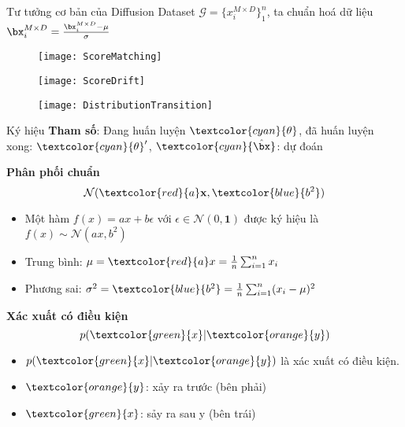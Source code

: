 \begin{frame}{Tư tưởng cơ bản của Diffusion}
	Dataset $\mathcal{G} = \{ x_{i}^{M \times D} \}_{1}^{n}$, ta chuẩn hoá dữ liệu $\bx_{i}^{M \times D} = \frac{\bx_{i}^{M \times D} - \mu}{\sigma}$
\begin{figure}
	\texttt{[image: ScoreMatching]}
\end{figure}
\vspace{-10pt}
\begin{figure}
	\texttt{[image: ScoreDrift]}
\end{figure}

\vspace{-10pt}

\begin{figure}
	\texttt{[image: DistributionTransition]}
\end{figure}

\end{frame}

\begin{frame}{Ký hiệu}
	\textbf{Tham số}: Đang huấn luyện {\Large$\textcolor{cyan}{\theta}$}, đã huấn luyện xong: {\Large$\textcolor{cyan}{\theta}'$}, {\Large$\textcolor{cyan}{\hat{\bx}}$}: dự đoán
	\vspace{-5pt}
	
	\textbf{Phân phối chuẩn}
	\vspace{-5pt}
	{\Large $$\mathcal{N}(\textcolor{red}{a} \mathbf{x}, \textcolor{blue}{b^2})$$}
	\vspace{-15pt}
	\begin{itemize}
		\item Một hàm $f(x) = a x + b\epsilon$ với $\epsilon \in \mathcal{N}(0, \mathbf{1})$ được ký hiệu là $f(x) \sim \mathcal{N}(a x, b^2) $
		
		\item Trung bình: $\mu = \textcolor{red}{a}x=\frac{1}{n} \sum_{i=1}^{n} x_i$
		
		\item Phương sai: $\sigma^2 = \textcolor{blue} {b^2} = \frac{1}{n} \sum_{i=1}^{n} (x_i - \mu)^2$
		
	\end{itemize}
	\textbf{Xác xuất có điều kiện}
	\vspace{-5pt}
	{\Large $$p(\textcolor{green}{x}| \textcolor{orange}{y})$$}
	\vspace{-15pt}
	
	\begin{itemize}
		\item $p(\textcolor{green}{x}| \textcolor{orange}{y})$ là xác xuất có điều kiện.
		\item $\textcolor{orange}{y}$: xảy ra trước (bên phải)
		\item $\textcolor{green}{x}$: sảy ra sau y (bên trái)
	\end{itemize}

\end{frame}

